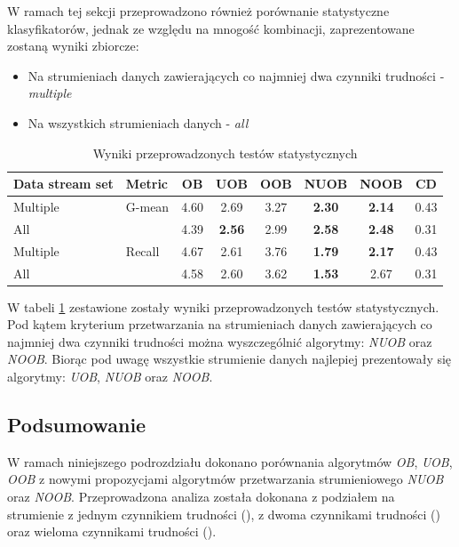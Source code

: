 W ramach tej sekcji przeprowadzono również porównanie statystyczne klasyfikatorów, jednak ze względu na mnogość kombinacji, zaprezentowane zostaną wyniki zbiorcze:

\begin{itemize}
    \item Na strumieniach danych zawierających co najmniej dwa czynniki trudności - \textit{multiple}
    \item Na wszystkich strumieniach danych - \textit{all}
\end{itemize}

\begin{table}[ht]
\centering\small%
\setlength{\tabcolsep}{10pt} 
\renewcommand{\arraystretch}{1.5} 
\begin{tabular}{l l c c c c c c}
\toprule
Data stream set & Metric & OB & UOB & OOB & NUOB & NOOB & CD \\
\midrule
Multiple & G-mean & 4.60 & 2.69 & 3.27 & \textbf{2.30} & \textbf{2.14} & 0.43 \\
All  & & 4.39 & \textbf{2.56} & 2.99 & \textbf{2.58} & \textbf{2.48} & 0.31 \\
Multiple & Recall & 4.67 & 2.61 & 3.76 & \textbf{1.79} & \textbf{2.17} & 0.43\\
All  & & 4.58 & 2.60 & 3.62 & \textbf{1.53} & 2.67 & 0.31 \\
\bottomrule
\end{tabular}
\caption{Wyniki przeprowadzonych testów statystycznych}\label{Tab:ComplexFriedman}
\end{table}

\noindent W tabeli \ref{Tab:ComplexFriedman} zestawione zostały wyniki przeprowadzonych testów statystycznych. Pod kątem kryterium przetwarzania na strumieniach danych zawierających co najmniej dwa czynniki trudności można wyszczególnić algorytmy: \textit{NUOB} oraz \textit{NOOB}. Biorąc pod uwagę wszystkie strumienie danych najlepiej prezentowały się algorytmy: \textit{UOB}, \textit{NUOB} oraz \textit{NOOB}.

\subsection{Podsumowanie}

\noindent W ramach niniejszego podrozdziału dokonano porównania algorytmów \textit{OB}, \textit{UOB}, \textit{OOB} z nowymi propozycjami algorytmów przetwarzania strumieniowego \textit{NUOB} oraz \textit{NOOB}. Przeprowadzona analiza została dokonana z podziałem na strumienie z jednym czynnikiem trudności (), z dwoma czynnikami trudności () oraz wieloma czynnikami trudności ().


